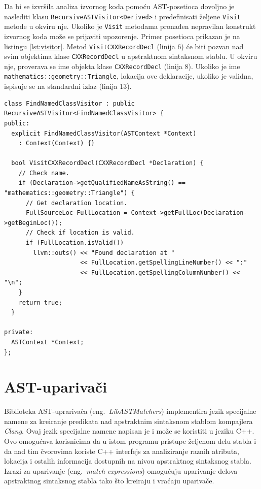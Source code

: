 \documentclass[12pt,oneside]{memoir}
\begin{document}
\par
Da bi se izvršila analiza izvornog koda pomoću AST-posetioca dovoljno je naslediti klasu 
 \texttt{RecursiveASTVisitor<Derived>} i predefinisati željene \texttt{Visit} metode u okviru nje. Ukoliko je \texttt{Visit} metodama pronađen nepravilan konstrukt izvornog koda mo\v{z}e se prijaviti upozorenje. Primer posetioca prikazan je na listingu \ref{lst:visitor}. Metod \texttt{VisitCXXRecordDecl} (linija 6) \'c{e} biti pozvan nad svim objektima klase \texttt{CXXRecordDecl} u apstraktnom sintaksnom stablu. U okviru nje, proverava se ime objekta klase \texttt{CXXRecordDecl} (linija 8). Ukoliko je ime \texttt{mathematics::geometry::\-Triangle}, lokacija ove deklaracije, ukoliko je validna, ispisuje se na standardni izlaz (linija 13).

\begin{lstlisting}[style=customc,  caption={Primer posetioaca koji pose\'{c}uje sve strukture, unije i klase i ispisuje lokaciju onih \v{c}iji naziv je \texttt{mathematics::geometry::Triangle}.},label=lst:visitor]
class FindNamedClassVisitor : public RecursiveASTVisitor<FindNamedClassVisitor> {
public:
  explicit FindNamedClassVisitor(ASTContext *Context)
    : Context(Context) {}

  bool VisitCXXRecordDecl(CXXRecordDecl *Declaration) {
    // Check name.
    if (Declaration->getQualifiedNameAsString() == "mathematics::geometry::Triangle") {
      // Get declaration location.
      FullSourceLoc FullLocation = Context->getFullLoc(Declaration->getBeginLoc());
      // Check if location is valid.
      if (FullLocation.isValid())
        llvm::outs() << "Found declaration at "
                     << FullLocation.getSpellingLineNumber() << ":"
                     << FullLocation.getSpellingColumnNumber() << "\n";
    }
    return true;
  }

private:
  ASTContext *Context;
};
\end{lstlisting}


\section{AST-upariva\v{c}i}
\label{sec:matchers}

Biblioteka AST-uprariva\v{c}a (eng.~\textit{LibASTMatchers}) implementira jezik specijalne namene za kreiranje predikata nad apstraktnim sintaksnom stablom kompajlera \textit{Clang}. Ovaj jezik specijalne namene napisan je i može se koristiti u jeziku C++. Ovo omogućava korisnicima da u istom programu pristupe željenom delu stabla i da nad tim čvorovima koriste C++ interfejs za analiziranje raznih atributa, lokacija i ostalih informacija dostupnih na nivou apstraktnog sintaksnog stabla. Izrazi za uparivanje (eng.~\textit{match expressions}) omogu\'{c}uju uparivanje delova apstraktnog sintaksnog stabla tako \v{s}to kreiraju i vra\'{c}aju upariva\v{c}e.
\end{document}
